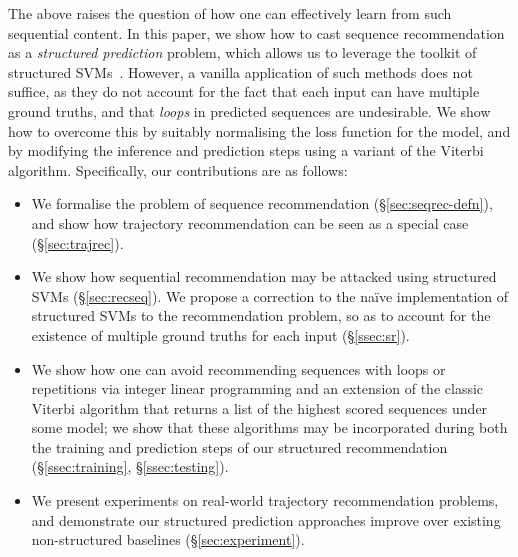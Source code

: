 The above raises the question of how one can effectively learn from such sequential content.
In this paper, we show how to cast sequence recommendation as a \emph{structured prediction} problem,
which allows us to leverage the toolkit of structured SVMs~\citep{tsochantaridis2005large}.
However, a vanilla application of such methods does not suffice,
as they do not account for the fact that each input can have multiple ground truths,
and that \emph{loops} in predicted sequences are undesirable.
We show how to overcome this by
suitably normalising the loss function for the model,
and by modifying the inference and prediction steps using a variant of the Viterbi algorithm.
Specifically, our contributions are as follows:
\begin{itemize}[noitemsep,leftmargin=12pt]\itemmoveup
	\item We formalise the problem of sequence recommendation (\S\ref{sec:seqrec-defn}), and show how trajectory recommendation can be seen as a special case (\S\ref{sec:trajrec}).

	\item We show how sequential recommendation may be attacked using structured SVMs (\S\ref{sec:recseq}).
	We propose a correction to the na\"{i}ve implementation of structured SVMs to the recommendation problem, so as to account for the existence of multiple ground truths for each input (\S\ref{ssec:sr}).
	
	\item We show how one can avoid recommending sequences with loops or repetitions via integer linear programming and an extension of the classic Viterbi algorithm that returns a list of the highest scored sequences under some model; we show that these algorithms may be incorporated during both the training %
	and prediction steps of our structured recommendation (\S\ref{ssec:training}, \S\ref{ssec:testing}).
	
	\item We present experiments on real-world trajectory recommendation problems, and demonstrate our structured prediction approaches improve over existing non-structured baselines (\S\ref{sec:experiment}).\itemmoveup
\end{itemize}

